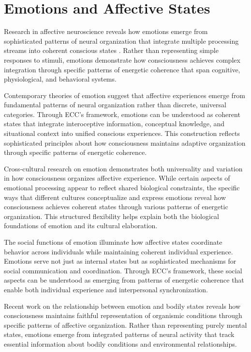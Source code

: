 \section{Emotions and Affective States}

Research in affective neuroscience reveals how emotions emerge from sophisticated patterns of neural organization that integrate multiple processing streams into coherent conscious states \cite{Panksepp1998}. Rather than representing simple responses to stimuli, emotions demonstrate how consciousness achieves complex integration through specific patterns of energetic coherence that span cognitive, physiological, and behavioral systems.

Contemporary theories of emotion \cite{Barrett2017} suggest that affective experiences emerge from fundamental patterns of neural organization rather than discrete, universal categories. Through ECC's framework, emotions can be understood as coherent states that integrate interoceptive information, conceptual knowledge, and situational context into unified conscious experiences. This construction reflects sophisticated principles about how consciousness maintains adaptive organization through specific patterns of energetic coherence.

Cross-cultural research on emotion \cite{Lutz1988} demonstrates both universality and variation in how consciousness organizes affective experience. While certain aspects of emotional processing appear to reflect shared biological constraints, the specific ways that different cultures conceptualize and express emotions reveal how consciousness achieves coherent states through various patterns of energetic organization. This structured flexibility helps explain both the biological foundations of emotion and its cultural elaboration.

The social functions of emotion \cite{Keltner2001} illuminate how affective states coordinate behavior across individuals while maintaining coherent individual experience. Emotions serve not just as internal states but as sophisticated mechanisms for social communication and coordination. Through ECC's framework, these social aspects can be understood as emerging from patterns of energetic coherence that enable both individual experience and interpersonal synchronization.

Recent work on the relationship between emotion and bodily states \cite{Damasio2018} reveals how consciousness maintains faithful representation of organismic conditions through specific patterns of affective organization. Rather than representing purely mental states, emotions emerge from integrated patterns of neural activity that track essential information about bodily conditions and environmental relationships.

